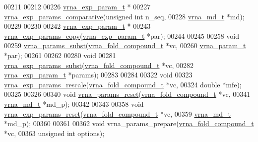 \begin{DoxyCode}
00211 
00212 
00226 \hyperlink{group__energy__parameters_structvrna__exp__param__s}{vrna\_exp\_param\_t} *
00227 \hyperlink{group__energy__parameters_gaf78c09e685e6eef4100b1a41d4042550}{vrna\_exp\_params\_comparative}(\textcolor{keywordtype}{unsigned} \textcolor{keywordtype}{int}  n\_seq,
00228                             \hyperlink{group__model__details_structvrna__md__s}{vrna\_md\_t}     *md);
00229 
00230 
00242 \hyperlink{group__energy__parameters_structvrna__exp__param__s}{vrna\_exp\_param\_t} *
00243 \hyperlink{group__energy__parameters_ga70bc46be7cfa5434a71efe241c4f0609}{vrna\_exp\_params\_copy}(\hyperlink{group__energy__parameters_structvrna__exp__param__s}{vrna\_exp\_param\_t} *par);
00244 
00245 
00258 \textcolor{keywordtype}{void}
00259 \hyperlink{group__energy__parameters_ga5d1909208f7ea3baa98b75afaa1f62ca}{vrna\_params\_subst}(\hyperlink{group__fold__compound_structvrna__fc__s}{vrna\_fold\_compound\_t}  *vc,
00260                   \hyperlink{group__energy__parameters_structvrna__param__s}{vrna\_param\_t}          *par);
00261 
00262 
00280 \textcolor{keywordtype}{void}
00281 \hyperlink{group__energy__parameters_ga8e7ac4fab3b0cc03afbc134eaafb3525}{vrna\_exp\_params\_subst}(\hyperlink{group__fold__compound_structvrna__fc__s}{vrna\_fold\_compound\_t}  *vc,
00282                       \hyperlink{group__energy__parameters_structvrna__exp__param__s}{vrna\_exp\_param\_t}      *params);
00283 
00284 
00322 \textcolor{keywordtype}{void}
00323 \hyperlink{group__energy__parameters_gad607bc3a5b5da16400e2ca4ea5560233}{vrna\_exp\_params\_rescale}(\hyperlink{group__fold__compound_structvrna__fc__s}{vrna\_fold\_compound\_t}  *vc,
00324                         \textcolor{keywordtype}{double}                *mfe);
00325 
00326 
00340 \textcolor{keywordtype}{void} \hyperlink{group__energy__parameters_gac40dc82e48a72a97cfc58b9da08a7792}{vrna\_params\_reset}(\hyperlink{group__fold__compound_structvrna__fc__s}{vrna\_fold\_compound\_t} *vc,
00341                        \hyperlink{group__model__details_structvrna__md__s}{vrna\_md\_t}            *md\_p);
00342 
00343 
00358 \textcolor{keywordtype}{void} \hyperlink{group__energy__parameters_gaa5409218068be84d7b50c78fbdaa85a9}{vrna\_exp\_params\_reset}(\hyperlink{group__fold__compound_structvrna__fc__s}{vrna\_fold\_compound\_t} *vc,
00359                            \hyperlink{group__model__details_structvrna__md__s}{vrna\_md\_t}            *md\_p);
00360 
00361 
00362 \textcolor{keywordtype}{void} vrna\_params\_prepare(\hyperlink{group__fold__compound_structvrna__fc__s}{vrna\_fold\_compound\_t} *vc,
00363                          \textcolor{keywordtype}{unsigned} \textcolor{keywordtype}{int}         options);

\end{DoxyCode}
